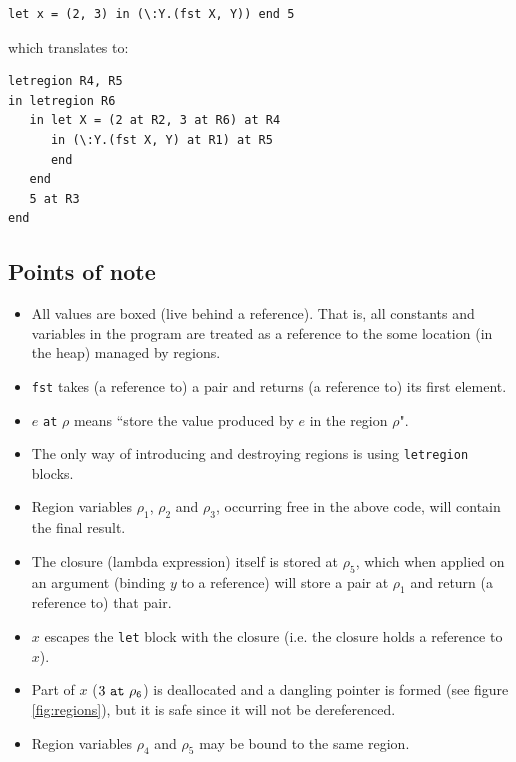 \documentclass[11pt]{report}
\begin{document}
\begin{lstlisting}
let x = (2, 3) in (\:Y.(fst X, Y)) end 5
\end{lstlisting}

\noindent which translates to:

\begin{lstlisting}
letregion R4, R5
in letregion R6
   in let X = (2 at R2, 3 at R6) at R4
      in (\:Y.(fst X, Y) at R1) at R5
      end
   end
   5 at R3
end
\end{lstlisting}

\subsection*{Points of note}

\begin{itemize}
\item All values are boxed (live behind a reference). That is, all constants and variables in the program are treated as a reference to the some location (in the heap) managed by regions.
\item \texttt{fst} takes (a reference to) a pair and returns (a reference to) its first element.
\item $e$ \texttt{at} $\rho$ means ``store the value produced by $e$ in the region $\rho$".
\item The only way of introducing and destroying regions is using \texttt{letregion} blocks.
\item Region variables $\rho_1$, $\rho_2$ and $\rho_3$, occurring free in the above code, will contain the final result.
\item The closure (lambda expression) itself is stored at $\rho_5$, which when applied on an argument (binding $y$ to a reference) will store a pair at $\rho_1$ and return (a reference to) that pair.
\item $x$ escapes the \texttt{let} block with the closure (i.e. the closure holds a reference to $x$).
\item Part of $x$ ($3\tt~at~\rho_6$) is deallocated and a dangling pointer is formed (see figure \ref{fig:regions}), but it is safe since it will not be dereferenced.
\item Region variables $\rho_4$ and $\rho_5$ may be bound to the same region.
\end{itemize}
\end{document}
